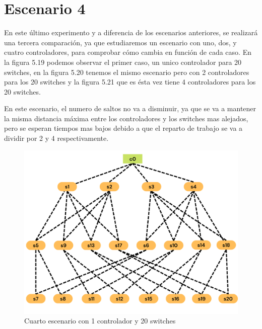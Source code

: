 \documentclass[a4paper, 12pt]{book}
\begin{document}
	\clearpage
	\section{Escenario 4}
	
	En este último experimento y a diferencia de los escenarios anteriores, se realizará una tercera comparación, ya que estudiaremos un escenario con uno, dos, y cuatro controladores, para comprobar cómo cambia en función de cada caso.
	En la figura 5.19 podemos observar el primer caso, un unico controlador para 20 switches, en la figura 5.20 tenemos el mismo escenario pero con 2 controladores para los 20 switches y la figura 5.21 que es ésta vez tiene 4 controladores para los 20 switches.
	
	En este escenario, el numero de saltos no va a disminuir, ya que se va a mantener la misma distancia máxima entre los controladores y los switches mas alejados, pero se esperan tiempos mas bajos debido a que el reparto de trabajo se va a dividir por 2 y 4 respectivamente.
	
	\begin{figure}[H]
		\centering
		\includegraphics[width=16cm, keepaspectratio]{img/e4_1}
		\caption{Cuarto escenario con 1 controlador y 20 switches}
		\label{figura:e4_1}
	\end{figure}
	
\end{document}
